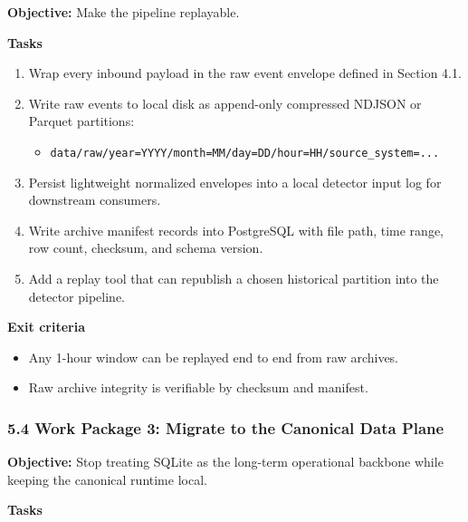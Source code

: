 \documentclass[
]{article}
\providecommand{\tightlist}{%
  \setlength{\itemsep}{0pt}\setlength{\parskip}{0pt}}
\begin{document}
\textbf{Objective:} Make the pipeline replayable.

\textbf{Tasks}

\begin{enumerate}
\def\labelenumi{\arabic{enumi}.}
\tightlist
\item
  Wrap every inbound payload in the raw event envelope defined in
  Section 4.1.
\item
  Write raw events to local disk as append-only compressed NDJSON or
  Parquet
  partitions:

  \begin{itemize}
  \tightlist
  \item
    \texttt{data/raw/year=YYYY/month=MM/day=DD/hour=HH/source\_system=...}
  \end{itemize}
\item
  Persist lightweight normalized envelopes into a local detector input
  log for downstream consumers.
\item
  Write archive manifest records into PostgreSQL with file path, time
  range, row count, checksum, and schema version.
\item
  Add a replay tool that can republish a chosen historical partition
  into the detector pipeline.
\end{enumerate}

\textbf{Exit criteria}

\begin{itemize}
\tightlist
\item
  Any 1-hour window can be replayed end to end from raw archives.
\item
  Raw archive integrity is verifiable by checksum and manifest.
\end{itemize}

\subsubsection{5.4 Work Package 3: Migrate to the Canonical Data
Plane}\label{54-work-package-3-migrate-to-the-canonical-data-plane}

\textbf{Objective:} Stop treating SQLite as the long-term operational
backbone while keeping the canonical runtime local.

\textbf{Tasks}
\end{document}
